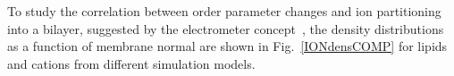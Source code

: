 \documentclass[pre,aps,floatfix,authordate1-4,twocolumn]{revtex4-1}
\begin{document}

To study the correlation between order parameter changes and ion partitioning into a bilayer, 
suggested by the electrometer concept~\cite{akutsu81,altenbach84,seelig87,scherer89}, the density distributions as a function of membrane normal 
are shown in Fig.~\ref{IONdensCOMP} for lipids and cations from different simulation models. 
\end{document}
